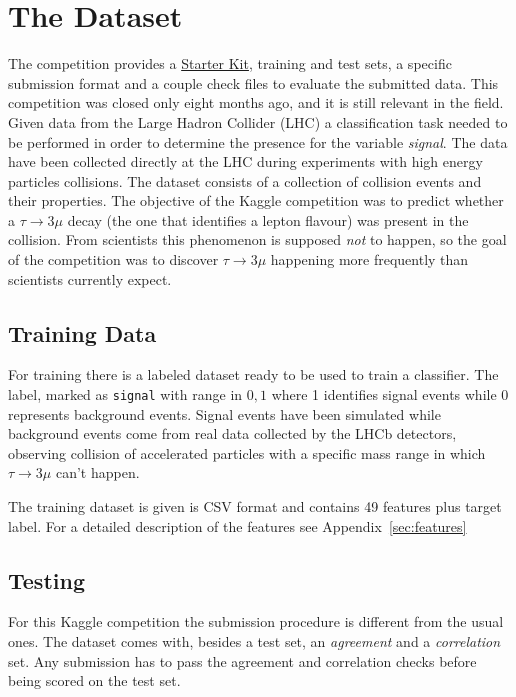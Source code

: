 \documentclass[conference]{IEEEtran}
\begin{document}
\section{The Dataset}
\label{sec:dataset}

The competition provides a \href{https://www.kaggle.com/c/flavours-of-physics/data}{Starter Kit}, training and test sets, a specific
submission format and a couple check files to evaluate the submitted data. This competition was closed only eight months ago, and it is still relevant in the field.
Given data from the Large Hadron Collider (LHC) a classification task needed to be performed in order to determine the presence for the variable \textit{signal}.  The data have been collected directly at the
LHC during experiments with high energy particles collisions. The dataset
consists of a collection of collision events and their properties. The objective
of the Kaggle competition was to predict whether a $\tau \rightarrow 3\mu$ decay
(the one that identifies a lepton flavour) was present in the collision. From
scientists this phenomenon is supposed \emph{not} to happen, so the goal of the
competition was to discover $\tau \rightarrow 3\mu$ happening more frequently
than scientists currently expect.

\subsection{Training Data}
For training there is a labeled dataset ready to be used to train a classifier.
The label, marked as \texttt{signal} with range in ${0,1}$ where 1 identifies
signal events while 0 represents background events. Signal events have been
simulated while background events come from real data collected by the LHCb
detectors, observing collision of accelerated particles with a specific mass
range in which $\tau \rightarrow 3\mu$ can't happen.

The training dataset is given is CSV format and contains 49 features plus target
label. For a detailed description of the features see
Appendix~\ref{sec:features}

\subsection{Testing}
For this Kaggle competition the submission procedure is different from the usual
ones. The dataset comes with, besides a test set, an \textit{agreement} and a
\textit{correlation} set. Any submission has to pass the agreement and
correlation checks before being scored on the test set.
\end{document}
